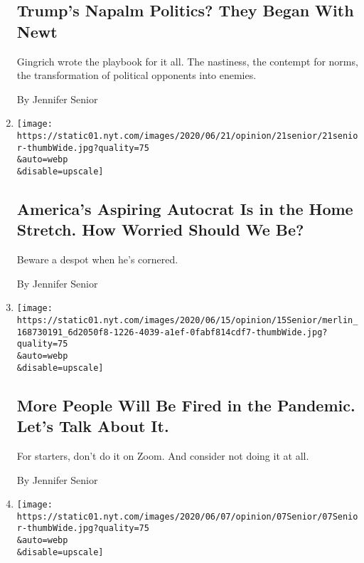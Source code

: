 \begin{enumerate}
{  \subsection{Trump's Napalm Politics? They Began With
  Newt}\label{trumps-napalm-politics-they-began-with-newt}}

  Gingrich wrote the playbook for it all. The nastiness, the contempt
  for norms, the transformation of political opponents into enemies.

  By Jennifer Senior
\item
  \href{/2020/06/21/opinion/trump-autocrat-barr.html}{}

  \texttt{[image: https://static01.nyt.com/images/2020/06/21/opinion/21senior/21senior-thumbWide.jpg?quality=75\\\&auto=webp\\\&disable=upscale]}

  \hypertarget{americas-aspiring-autocrat-is-in-the-home-stretch-how-worried-should-we-be}{%
  \subsection{America's Aspiring Autocrat Is in the Home Stretch. How
  Worried Should We
  Be?}\label{americas-aspiring-autocrat-is-in-the-home-stretch-how-worried-should-we-be}}

  Beware a despot when he's cornered.

  By Jennifer Senior
\item
  \href{/2020/06/14/opinion/layoffs-coronavirus-economy.html}{}

  \texttt{[image: https://static01.nyt.com/images/2020/06/15/opinion/15Senior/merlin\_168730191\_6d2050f8-1226-4039-a1ef-0fabf814cdf7-thumbWide.jpg?quality=75\\\&auto=webp\\\&disable=upscale]}

  \hypertarget{more-people-will-be-fired-in-the-pandemic-lets-talk-about-it}{%
  \subsection{More People Will Be Fired in the Pandemic. Let's Talk
  About
  It.}\label{more-people-will-be-fired-in-the-pandemic-lets-talk-about-it}}

  For starters, don't do it on Zoom. And consider not doing it at all.

  By Jennifer Senior
\item
  \href{/2020/06/07/opinion/trump-mattis-polls.html}{}

  \texttt{[image: https://static01.nyt.com/images/2020/06/07/opinion/07Senior/07Senior-thumbWide.jpg?quality=75\\\&auto=webp\\\&disable=upscale]}


\end{enumerate}
